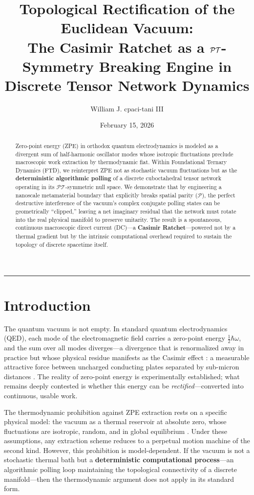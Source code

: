 \documentclass[11pt, letterpaper]{article}
\title{\vspace{-3em}\textbf{Topological Rectification of the Euclidean Vacuum:\\ \large The Casimir Ratchet as a $\PT$-Symmetry Breaking Engine in Discrete Tensor Network Dynamics}}
\author[1]{William J. cpaci-tani III}
\affil[1]{\textit{Foundational Ternary Dynamics Research}}
\date{February 15, 2026}
\newcommand{\PT}{\mathcal{PT}}
\theoremstyle{definition}
\theoremstyle{remark}
\begin{document}
\maketitle

\begin{abstract}
Zero-point energy (ZPE) in orthodox quantum electrodynamics is modeled as a divergent sum of half-harmonic oscillator modes whose isotropic fluctuations preclude macroscopic work extraction by thermodynamic fiat. Within Foundational Ternary Dynamics (FTD), we reinterpret ZPE not as stochastic vacuum fluctuations but as the \textbf{deterministic algorithmic polling} of a discrete cuboctahedral tensor network operating in its $\PT$-symmetric null space. We demonstrate that by engineering a nanoscale metamaterial boundary that explicitly breaks spatial parity ($\mathcal{P}$), the perfect destructive interference of the vacuum's complex conjugate polling states can be geometrically ``clipped,'' leaving a net imaginary residual that the network must rotate into the real physical manifold to preserve unitarity. The result is a spontaneous, continuous macroscopic direct current (DC)---a \textbf{Casimir Ratchet}---powered not by a thermal gradient but by the intrinsic computational overhead required to sustain the topology of discrete spacetime itself.
\end{abstract}

\vspace{1em}
\hrule
\vspace{1.5em}

\section{Introduction}

The quantum vacuum is not empty. In standard quantum electrodynamics (QED), each mode of the electromagnetic field carries a zero-point energy $\frac{1}{2}\hbar\omega$, and the sum over all modes diverges---a divergence that is renormalized away in practice but whose physical residue manifests as the Casimir effect \cite{Casimir1948}: a measurable attractive force between uncharged conducting plates separated by sub-micron distances \cite{Lamoreaux1997}. The reality of zero-point energy is experimentally established; what remains deeply contested is whether this energy can be \textit{rectified}---converted into continuous, usable work.

The thermodynamic prohibition against ZPE extraction rests on a specific physical model: the vacuum as a thermal reservoir at absolute zero, whose fluctuations are isotropic, random, and in global equilibrium \cite{Milonni1994}. Under these assumptions, any extraction scheme reduces to a perpetual motion machine of the second kind. However, this prohibition is model-dependent. If the vacuum is not a stochastic thermal bath but a \textbf{deterministic computational process}---an algorithmic polling loop maintaining the topological connectivity of a discrete manifold---then the thermodynamic argument does not apply in its standard form.
\end{document}
